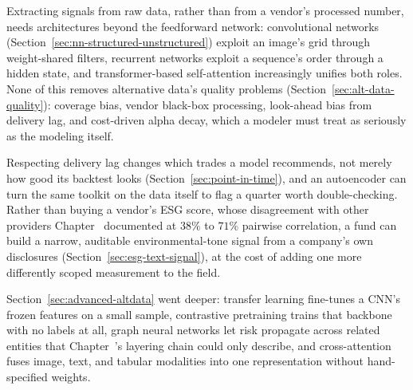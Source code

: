 \documentclass[../ai_in_finance]{subfiles}
\begin{document}
Extracting signals from raw data, rather than from a vendor's processed number, needs architectures beyond the feedforward network: convolutional networks (Section~\ref{sec:nn-structured-unstructured}) exploit an image's grid through weight-shared filters, recurrent networks exploit a sequence's order through a hidden state, and transformer-based self-attention increasingly unifies both roles. None of this removes alternative data's quality problems (Section~\ref{sec:alt-data-quality}): coverage bias, vendor black-box processing, look-ahead bias from delivery lag, and cost-driven alpha decay, which a modeler must treat as seriously as the modeling itself.

Respecting delivery lag changes which trades a model recommends, not merely how good its backtest looks (Section~\ref{sec:point-in-time}), and an autoencoder can turn the same toolkit on the data itself to flag a quarter worth double-checking. Rather than buying a vendor's ESG score, whose disagreement with other providers Chapter~ documented at $38\%$ to $71\%$ pairwise correlation, a fund can build a narrow, auditable environmental-tone signal from a company's own disclosures (Section~\ref{sec:esg-text-signal}), at the cost of adding one more differently scoped measurement to the field.

Section~\ref{sec:advanced-altdata} went deeper: transfer learning fine-tunes a CNN's frozen features on a small sample, contrastive pretraining trains that backbone with no labels at all, graph neural networks let risk propagate across related entities that Chapter~'s layering chain could only describe, and cross-attention fuses image, text, and tabular modalities into one representation without hand-specified weights.

\end{document}
